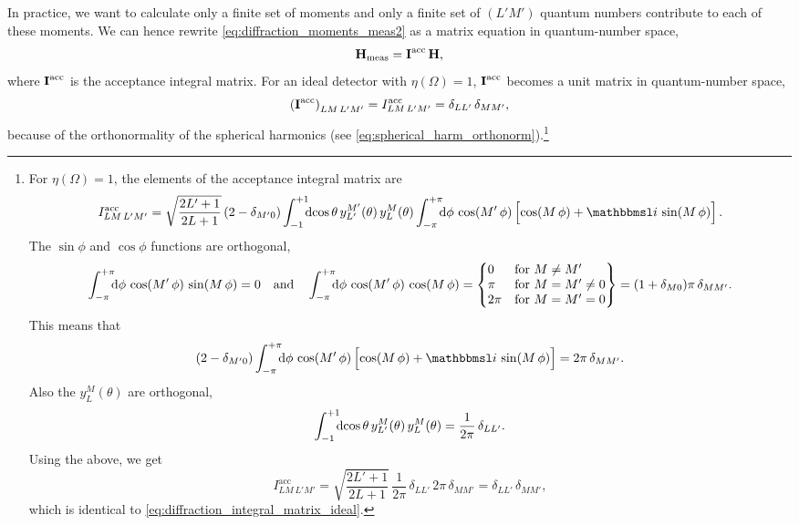 In practice, we want to calculate only a finite set of moments and
only a finite set of $(L' M')$ quantum numbers contribute to each of
these moments.  We can hence rewrite
\cref{eq:diffraction_moments_meas2} as a matrix equation in
quantum-number space, \ie
\begin{equation}
  \label{eq:diffraction_moments_meas_matrix}
  \bm{\mathrm{H}}_\text{meas}
  = \bm{\mathrm{I}}^\text{acc}\, \bm{\mathrm{H}},
\end{equation}
where $\bm{\mathrm{I}}^\text{acc}$ is the acceptance integral matrix.  For
an ideal detector with $\eta(\Omega) = 1$, $\bm{\mathrm{I}}^\text{acc}$
becomes a unit matrix in quantum-number space, \ie
\begin{equation}
  \label{eq:diffraction_integral_matrix_ideal}
  \rBrk{\mat{I}^\text{acc}}_{L M\, L' M'}
  = I^\text{acc}_{L M\, L' M'}
  = \delta_{L L'}\, \delta_{M M'},
\end{equation}
because of the orthonormality of the spherical harmonics (see
\cref{eq:spherical_harm_orthonorm}).\footnote{%
  \label{fn:diffraction_integral_matrix_perfect_det}%
  For $\eta(\Omega) = 1$, the elements of the acceptance integral
  matrix are
  \begin{equation}
    I^\text{acc}_{L M\, L' M'}
    = \sqrt{\frac{2 L' + 1}{2 L + 1}}\, (2 - \delta_{M' 0})
    \int_{-1}^{+1}\!\!\! \dif{\cos\theta}\, y_{L'}^{M'}(\theta)\, y_L^M(\theta)
    \int_{-\pi}^{+\pi}\!\!\! \dif{\phi}\, \cos(M'\, \phi) \sBrk[2]{\cos(M\, \phi) + \imag\, \sin(M\, \phi)}.
  \end{equation}
  The $\sin \phi$ and $\cos \phi$ functions are orthogonal, \ie
  \begin{equation}
    \label{eq:sin_cos_orthogonality}
    \int_{-\pi}^{+\pi}\!\!\! \dif{\phi}\, \cos(M'\, \phi)\, \sin(M\, \phi)
    = 0
    \quad\text{and}\quad
    \int_{-\pi}^{+\pi}\!\!\! \dif{\phi}\, \cos(M'\, \phi)\, \cos(M\, \phi)
    = \begin{Bmatrix*}[l]
      0    & \text{for $M \neq M'$} \\
      \pi  & \text{for $M = M' \neq 0$} \\
      2\pi & \text{for $M = M' = 0$}
    \end{Bmatrix*}
    = (1 + \delta_{M 0}) \pi\, \delta_{M M'}.
  \end{equation}
  This means that
  \begin{equation}
    (2 - \delta_{M' 0})
    \int_{-\pi}^{+\pi}\!\!\! \dif{\phi}\, \cos(M'\, \phi) \sBrk[2]{\cos(M\, \phi) + \imag\, \sin(M\, \phi)}
    = 2 \pi\, \delta_{M M'}.
  \end{equation}
  Also the $y_L^M(\theta)$ are orthogonal, \ie
  \begin{equation}
    \label{eq:small_y_orthogonality}
    \int_{-1}^{+1}\!\!\! \dif{\cos\theta}\, y_{L'}^{M}(\theta)\, y_L^M(\theta)
    = \frac{1}{2 \pi}\, \delta_{L L'}.
  \end{equation}
  Using the above, we get
  \begin{equation}
    I^\text{acc}_{L M\, L' M'}
    = \sqrt{\frac{2 L' + 1}{2 L + 1}}\,
    \frac{1}{2 \pi}\, \delta_{L L'}\,
    2 \pi\, \delta_{M M'}
    = \delta_{L L'}\, \delta_{M M'},
  \end{equation}
  which is identical to \cref{eq:diffraction_integral_matrix_ideal}.
}
